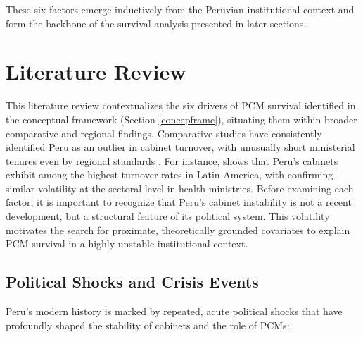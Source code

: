 \documentclass[a4paper, 12pt]{article}
\begin{document}
These six factors emerge inductively from the Peruvian institutional context and form the backbone of the survival analysis presented in later sections.



\section{Literature Review}\label{sec:letrev}


This literature review contextualizes the six drivers of PCM survival identified in the conceptual framework (Section \ref{concepframe}), situating them within broader comparative and regional findings. Comparative studies have consistently identified Peru as an outlier in cabinet turnover, with unusually short ministerial tenures even by regional standards \citep{martinez-gallardo_out_2012, gozzer_duracion_2021}. For instance, \citet{martinez-gallardo_out_2012} shows that Peru's cabinets exhibit among the highest turnover rates in Latin America, with \citet{gozzer_duracion_2021} confirming similar volatility at the sectoral level in health ministries. Before examining each factor, it is important to recognize that Peru's cabinet instability is not a recent development, but a structural feature of its political system. This volatility motivates the search for proximate, theoretically grounded covariates to explain PCM survival in a highly unstable institutional context.


\subsection{Political Shocks and Crisis Events}

Peru’s modern history is marked by repeated, acute political shocks that have profoundly shaped the stability of cabinets and the role of PCMs:
\end{document}
